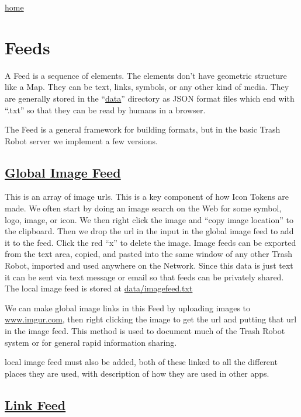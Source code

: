 \href{index.html}{home}

\section{Feeds}\label{feeds}

A Feed is a sequence of elements. The elements don't have geometric
structure like a Map. They can be text, links, symbols, or any other
kind of media. They are generally stored in the ``\href{data/}{data}''
directory as JSON format files which end with ``.txt'' so that they can
be read by humans in a browser.

The Feed is a general framework for building formats, but in the basic
Trash Robot server we implement a few versions.

\subsection{\texorpdfstring{\href{globalimagefeed.html}{Global Image
Feed}}{Global Image Feed}}\label{global-image-feed}

This is an array of image urls. This is a key component of how Icon
Tokens are made. We often start by doing an image search on the Web for
some symbol, logo, image, or icon. We then right click the image and
``copy image location'' to the clipboard. Then we drop the url in the
input in the global image feed to add it to the feed. Click the red
``x'' to delete the image. Image feeds can be exported from the text
area, copied, and pasted into the same window of any other Trash Robot,
imported and used anywhere on the Network. Since this data is just text
it can be sent via text message or email so that feeds can be privately
shared. The local image feed is stored at \url{data/imagefeed.txt}

We can make global image links in this Feed by uploading images to
\href{https://imgur.com/}{www.imgur.com}, then right clicking the image
to get the url and putting that url in the image feed. This method is
used to document much of the Trash Robot system or for general rapid
information sharing.

local image feed must also be added, both of these linked to all the different places they are used, with description of how they are used in other apps.

\subsection{\texorpdfstring{\href{linkfeed.html}{Link
Feed}}{Link Feed}}\label{link-feed}


